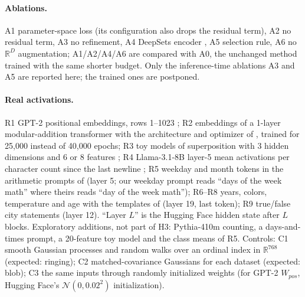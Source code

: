 \documentclass[10pt]{article}
\begin{document}
\paragraph{Ablations.} A1 parameter-space loss (its configuration also drops the residual term), A2 no residual term, A3 no refinement, A4 DeepSets encoder \citep{zaheer2017deepsets}, A5 selection rule, A6 no $\mathbb{R}^D$ augmentation; A1/A2/A4/A6 are compared with A0, the unchanged method trained with the same shorter budget. Only the inference-time ablations A3 and A5 are reported here; the trained ones are postponed.
\paragraph{Real activations.} R1 GPT-2 positional embeddings, rows 1--1023 \citep{radford2019gpt2,yedidia2023helix}; R2 embeddings of a 1-layer modular-addition transformer with the architecture and optimizer of \citet{nanda2023progress}, trained for 25{,}000 instead of 40{,}000 epochs; R3 toy models of superposition with 3 hidden dimensions and 6 or 8 features \citep{elhage2022tms}; R4 Llama-3.1-8B \citep{grattafiori2024llama3} layer-5 mean activations per character count since the last newline \citep{gurnee2025linebreaks,sinii2026counting}; R5 weekday and month tokens in the arithmetic prompts of \citet{engels2025notall} (layer 5; our weekday prompt reads ``days of the week math'' where theirs reads ``day of the week math''); R6--R8 years, colors, temperature and age with the templates of \citet{bhalla2026sae} (layer 19, last token); R9 true/false city statements \citep{marks2024truth} (layer 12). ``Layer $L$'' is the Hugging Face hidden state after $L$ blocks. Exploratory additions, not part of H3: Pythia-410m \citep{biderman2023pythia} counting, a days-and-times prompt, a 20-feature toy model and the class means of R5. Controls: C1 smooth Gaussian processes and random walks over an ordinal index in $\mathbb{R}^{768}$ (expected: ringing); C2 matched-covariance Gaussians for each dataset (expected: blob); C3 the same inputs through randomly initialized weights (for GPT-2 $W_{pos}$, Hugging Face's $\mathcal{N}(0,0.02^2)$ initialization).
\end{document}
